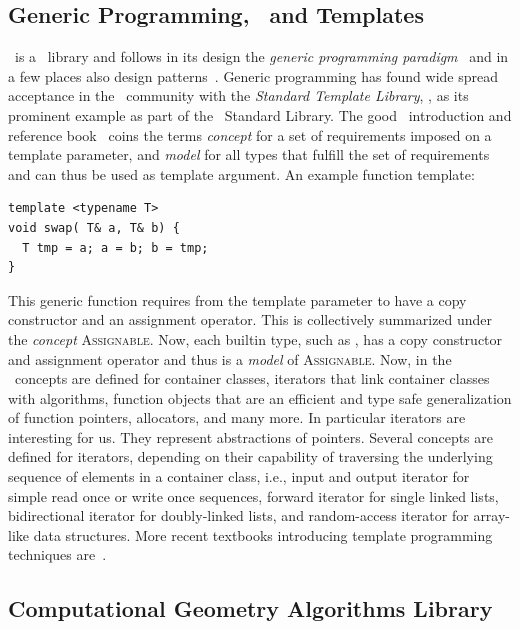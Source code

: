 \subsection{Generic Programming, \CC\ and Templates}

\cgal\ is a \CC\ library and follows in its design the \emph{generic
  programming paradigm\/}~\cite{cgal:ms-aogl-94,cgal:sl-stl-95} and in
a few places also design patterns~\cite{Gamma:1995:DP}. Generic
programming has found wide spread acceptance in the \CC\ community
with the \emph{Standard Template Library}, \stl, as its prominent
example as part of the \CC\ Standard Library. The good \stl\ 
introduction and reference book~\cite{cgal:a-gps-98} coins the terms
\emph{concept} for a set of requirements imposed on a template
parameter, and \emph{model\/} for all types that fulfill the set of
requirements and can thus be used as template argument. An example
function template:

\begin{lstlisting}
template <typename T>
void swap( T& a, T& b) {
  T tmp = a; a = b; b = tmp;
}
\end{lstlisting}

This generic  function requires from the template
parameter  to have a copy constructor and an assignment
operator. This is collectively summarized under the \emph{concept\/}
\textsc{Assignable}. Now, each builtin type, such as \CodeFmt{double},
has a copy constructor and assignment operator and thus is a
\emph{model\/} of \textsc{Assignable}. Now, in the \stl\ concepts are
defined for container classes, iterators that link container classes
with algorithms, function objects that are an efficient and type safe
generalization of function pointers, allocators, and many more. In
particular iterators are interesting for us. They represent
abstractions of pointers. Several concepts are defined for iterators,
depending on their capability of traversing the underlying sequence of
elements in a container class, i.e., input and output iterator for
simple read once or write once sequences, forward iterator for single
linked lists, bidirectional iterator for doubly-linked lists, and
random-access iterator for array-like data structures. More recent
textbooks introducing template programming techniques
are~\cite{Alexandrescu:2001:MCD,cgal:vj-ctcg-03}.

\subsection{Computational Geometry Algorithms Library}

